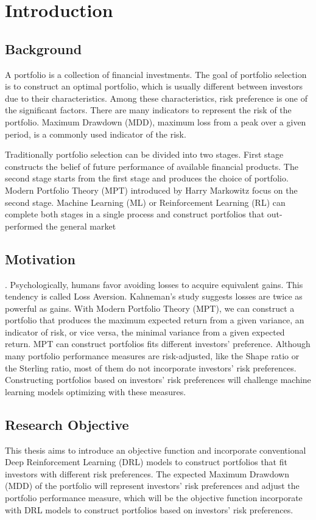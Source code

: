 \chapter{Introduction}
\section {Background}
A portfolio is a collection of financial investments. The goal of portfolio selection is to construct an optimal portfolio, which is usually different between investors due to their characteristics. Among these characteristics, risk preference is one of the significant factors. There are many indicators to represent the risk of the portfolio. Maximum Drawdown (MDD),  maximum loss from a peak over a given period, is a commonly used indicator of the risk.

Traditionally portfolio selection can be divided into two stages. First stage constructs the belief of future performance of available financial products. The second stage starts from the first stage and produces the choice of portfolio.  Modern Portfolio Theory (MPT) introduced by  Harry Markowitz \cite{10.2307/2975974} focus on the second stage. Machine Learning (ML) or Reinforcement Learning (RL) can complete both stages in a single process and construct portfolios that out-performed the general market\cite{KRAUSS2017689}
\section {Motivation}.
Psychologically, humans favor avoiding losses to acquire equivalent gains. This tendency is called Loss Aversion.\cite{kahneman2000analysis} Kahneman's study suggests losses are twice as powerful as gains\cite{Tversky1992}. With Modern Portfolio Theory (MPT), we can construct a portfolio that produces the maximum expected return from a given variance, an indicator of risk, or vice versa, the minimal variance from a given expected return\cite{10.2307/2975974}. MPT can construct portfolios fits different investors' preference.
Although many portfolio performance measures are risk-adjusted\cite{cogneau2009101}, like the Shape ratio\cite{Sharpe49} or the Sterling ratio\cite{magdon2004maximum}, most of them do not incorporate investors' risk preferences. Constructing portfolios based on investors' risk preferences will challenge machine learning models optimizing with these measures.

\section {Research Objective}
This thesis aims to introduce an objective function and incorporate conventional Deep Reinforcement Learning (DRL) models to construct portfolios that fit investors with different risk preferences. The expected Maximum Drawdown (MDD) of the portfolio will represent investors' risk preferences and adjust the portfolio performance measure, which will be the objective function incorporate with DRL models to construct portfolios based on investors' risk preferences.
\label{c:intro}

